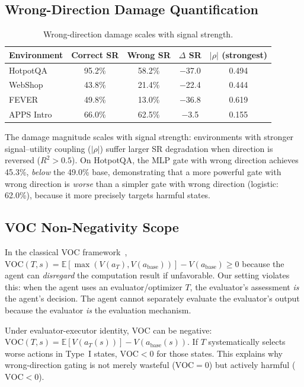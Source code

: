 \subsection{Wrong-Direction Damage Quantification}

\begin{table}[h]
\centering\small
\caption{Wrong-direction damage scales with signal strength.}
\begin{tabular}{lcccc}
\toprule
Environment & Correct SR & Wrong SR & $\Delta$ SR & $|\rho|$ (strongest) \\
\midrule
HotpotQA   & 95.2\% & 58.2\% & $-$37.0 & 0.494 \\
WebShop    & 43.8\% & 21.4\% & $-$22.4 & 0.444 \\
FEVER      & 49.8\% & 13.0\% & $-$36.8 & 0.619 \\
APPS Intro & 66.0\% & 62.5\% & $-$3.5  & 0.155 \\
\bottomrule
\end{tabular}
\end{table}

The damage magnitude scales with signal strength: environments with
stronger signal--utility coupling ($|\rho|$) suffer larger SR degradation
when direction is reversed ($R^2 > 0.5$). On HotpotQA, the MLP gate
with wrong direction achieves 45.3\%, \emph{below} the 49.0\% base,
demonstrating that a more powerful gate with wrong direction is
\emph{worse} than a simpler gate with wrong direction (logistic: 62.0\%),
because it more precisely targets harmful states.

\subsection{VOC Non-Negativity Scope}

In the classical VOC framework~\citep{russell1991right},
$\mathrm{VOC}(T, s) = \mathbb{E}[\max(V(a_T), V(a_{\mathrm{base}}))] - V(a_{\mathrm{base}}) \geq 0$
because the agent can \emph{disregard} the computation result if
unfavorable. Our setting violates this: when the agent uses an
evaluator/optimizer $T$, the evaluator's assessment \emph{is} the
agent's decision. The agent cannot separately evaluate the
evaluator's output because the evaluator \emph{is} the evaluation
mechanism.

Under evaluator-executor identity, VOC can be negative:
$\mathrm{VOC}(T, s) = \mathbb{E}[V(a_T(s))] - V(a_{\mathrm{base}}(s))$.
If $T$ systematically selects worse actions in Type~I states,
$\mathrm{VOC} < 0$ for those states. This explains why wrong-direction
gating is not merely wasteful ($\mathrm{VOC} = 0$) but actively
harmful ($\mathrm{VOC} < 0$).


